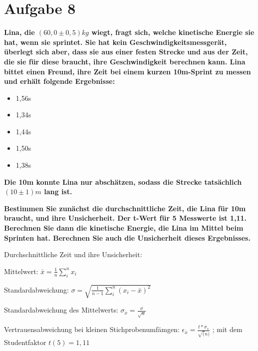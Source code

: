 \documentclass[
]{article}
\providecommand{\tightlist}{%
  \setlength{\itemsep}{0pt}\setlength{\parskip}{0pt}}
\begin{document}
\hypertarget{aufgabe-8}{%
\section{Aufgabe 8}\label{aufgabe-8}}

\textbf{Lina, die \((60,0 \pm 0,5)kg\) wiegt, fragt sich, welche
kinetische Energie sie hat, wenn sie sprintet. Sie hat kein
Geschwindigkeitsmessgerät, überlegt sich aber, dass sie aus einer festen
Strecke und aus der Zeit, die sie für diese braucht, ihre
Geschwindigkeit berechnen kann. Lina bittet einen Freund, ihre Zeit bei
einem kurzen 10m-Sprint zu messen und erhält folgende Ergebnisse:}

\begin{itemize}
\tightlist
\item
  1,56s
\item
  1,34s
\item
  1,44s
\item
  1,50s
\item
  1,38s
\end{itemize}

\textbf{Die 10m konnte Lina nur abschätzen, sodass die Strecke
tatsächlich \((10 \pm 1)m\) lang ist.}

\textbf{Bestimmen Sie zunächst die durchschnittliche Zeit, die Lina für
10m braucht, und ihre Unsicherheit. Der t-Wert für 5 Messwerte ist 1,11.
Berechnen Sie dann die kinetische Energie, die Lina im Mittel beim
Sprinten hat. Berechnen Sie auch die Unsicherheit dieses Ergebnisses.}

Durchschnittliche Zeit und ihre Unsicherheit:

Mittelwert: \(\bar{x} = \frac {1}{n}\sum_{i}^n x_i\)

Standardabweichung:
\(\sigma = \sqrt{\frac{1}{n-1}\sum_{i}^n (x_i - \bar{x})^2}\)

Standardabweichung des Mittelwerts:
\(\sigma_{\bar{x}}= \frac{\sigma}{\sqrt{n}}\)

Vertrauensabweichung bei kleinen Stichprobenumfämgen:
\(\epsilon_{\bar{x}}= \frac{t*\sigma_x}{\sqrt(n)}\) ; mit dem
Studentfaktor \(t(5)=1,11\)
\end{document}
